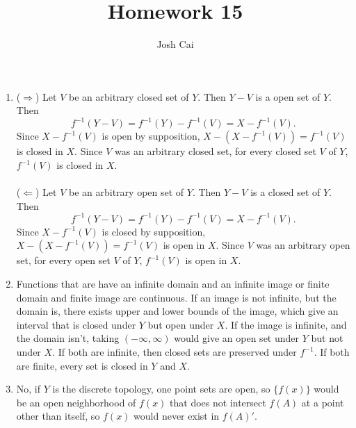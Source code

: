 \documentclass{article}
\begin{document}
\title{Homework 15}
\author{Josh Cai}

\maketitle
\begin{enumerate}
\item
($\Rightarrow$) Let $V$ be an arbitrary closed set of $Y$. Then $Y-V$ is a open set of $Y$. Then \[f^{-1}(Y-V) = f^{-1}(Y)-f^{-1}(V)= X-f^{-1}(V).\] Since $X-f^{-1}(V)$ is open by supposition, $X-(X-f^{-1}(V)) = f^{-1}(V)$ is closed in $X$. Since $V$ was an arbitrary closed set, for every closed set $V$ of $Y$, $f^{-1}(V)$ is closed in $X$.
\\\\($\Leftarrow$) Let $V$ be an arbitrary open set of $Y$. Then $Y-V$ is a closed set of $Y$. Then \[f^{-1}(Y-V) = f^{-1}(Y)-f^{-1}(V)= X-f^{-1}(V).\] Since $X-f^{-1}(V)$ is closed by supposition, $X-(X-f^{-1}(V)) = f^{-1}(V)$ is open in $X$. Since $V$ was an arbitrary open set, for every open set $V$ of $Y$, $f^{-1}(V)$ is open in $X$.

\item
Functions that are have an infinite domain and an infinite image or finite domain and finite image are continuous. If an image is not infinite, but the domain is, there exists upper and lower bounds of the image, which give an interval that is closed under $Y$ but open under $X$. If the image is infinite, and the domain isn't, taking $(-\infty, \infty)$ would give an open set under $Y$ but not under $X$. If both are infinite, then closed sets are preserved under $f^{-1}$. If both are finite, every set is closed in $Y$ and $X$. 

\item
No, if $Y$ is the discrete topology, one point sets are open, so $\{f(x)\}$ would be an open neighborhood of $f(x)$ that does not intersect $f(A)$ at a point other than itself, so $f(x)$ would never exist in $f(A)'$.


\end{enumerate}
\end{document}
